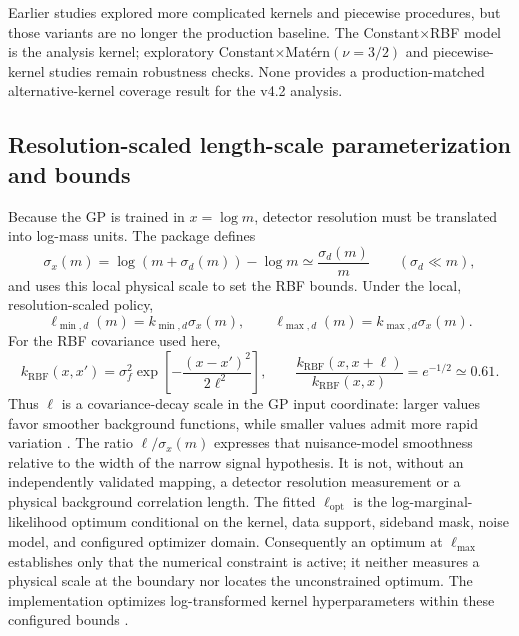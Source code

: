 Earlier studies explored more complicated kernels and piecewise procedures, but those
variants are no longer the production baseline. The Constant$\times$RBF model is the
analysis kernel; exploratory Constant$\times$Mat\'ern$(\nu=3/2)$ and piecewise-kernel
studies remain robustness checks. None provides a production-matched
alternative-kernel coverage result for the v4.2 analysis.

\subsection{Resolution-scaled length-scale parameterization and bounds}
\label{sec:length-scale}

Because the GP is trained in $x=\log m$, detector resolution must be translated into
log-mass units. The package defines
\begin{equation}
\sigma_x(m) = \log\!\left(m+\sigma_d(m)\right) - \log m
\simeq \frac{\sigma_d(m)}{m}
\qquad (\sigma_d \ll m),
\end{equation}
and uses this local physical scale to set the RBF bounds. Under the local,
resolution-scaled policy,
\begin{equation}
\ell_{\min,d}(m) = k_{\min,d}\sigma_x(m),
\qquad
\ell_{\max,d}(m) = k_{\max,d}\sigma_x(m).
\label{eq:dataset-lengthscale-bounds}
\end{equation}
For the RBF covariance used here,
\begin{equation}
k_{\mathrm{RBF}}(x,x') =
\sigma_f^2\exp\!\left[-\frac{(x-x')^2}{2\ell^2}\right],
\qquad
\frac{k_{\mathrm{RBF}}(x,x+\ell)}{k_{\mathrm{RBF}}(x,x)}
=e^{-1/2}\simeq0.61 .
\label{eq:rbf-lengthscale-interpretation}
\end{equation}
Thus $\ell$ is a covariance-decay scale in the GP input coordinate: larger values
favor smoother background functions, while smaller values admit more rapid
variation \cite{RasmussenWilliams2006,FrateGP2017}. The ratio
$\ell/\sigma_x(m)$ expresses that nuisance-model smoothness relative to the width of
the narrow signal hypothesis. It is not, without an independently validated mapping,
a detector resolution measurement or a physical background correlation length.
The fitted $\ell_{\mathrm{opt}}$ is the log-marginal-likelihood optimum conditional
on the kernel, data support, sideband mask, noise model, and configured optimizer
domain. Consequently an optimum at $\ell_{\max}$ establishes only that the numerical
constraint is active; it neither measures a physical scale at the boundary nor
locates the unconstrained optimum. The implementation optimizes log-transformed
kernel hyperparameters within these configured bounds
\cite{ScikitLearnGPRDocs16}.

